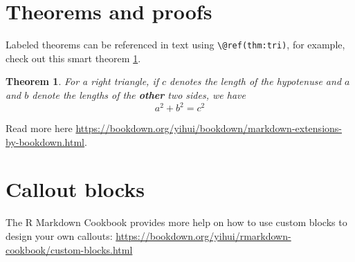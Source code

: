 \documentclass[
]{book}
\newtheorem{theorem}{Theorem}[chapter]
\theoremstyle{definition}
\theoremstyle{definition}
\theoremstyle{definition}
\theoremstyle{definition}
\theoremstyle{remark}
\begin{document}
\hypertarget{theorems-and-proofs}{%
\section{Theorems and proofs}\label{theorems-and-proofs}}

Labeled theorems can be referenced in text using \texttt{\textbackslash{}@ref(thm:tri)}, for example, check out this smart theorem \ref{thm:tri}.

\begin{theorem}
\protect\hypertarget{thm:tri}{}\label{thm:tri}For a right triangle, if \(c\) denotes the \emph{length} of the hypotenuse
and \(a\) and \(b\) denote the lengths of the \textbf{other} two sides, we have
\[a^2 + b^2 = c^2\]
\end{theorem}

Read more here \url{https://bookdown.org/yihui/bookdown/markdown-extensions-by-bookdown.html}.

\hypertarget{callout-blocks}{%
\section{Callout blocks}\label{callout-blocks}}

The R Markdown Cookbook provides more help on how to use custom blocks to design your own callouts: \url{https://bookdown.org/yihui/rmarkdown-cookbook/custom-blocks.html}

  
\end{document}
